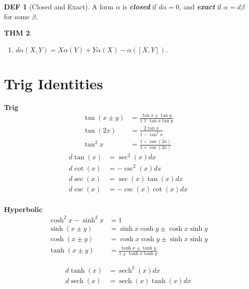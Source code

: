 \documentclass[twocolumn]{article}
\renewcommand{\emph}[1]{\textbf{\textit{#1}}}
\DeclareMathOperator{\sech}{sech}
\newtheorem{thm}{THM}
\theoremstyle{definition}
\newtheorem{defi}[thm]{DEF}
\begin{document}
\begin{defi}[Closed and Exact]
	A form $\alpha$ is \emph{closed} if $d \alpha = 0$, and \emph{exact} if $\alpha = d \beta$ for some $\beta$.
\end{defi}
\begin{thm}
	\begin{enumerate}
		\item $d \alpha(X, Y) = X \alpha (Y) + Y \alpha(X) - \alpha([X, Y])$.
	\end{enumerate}
\end{thm}

\section{Trig Identities}

\textbf{Trig}
\begin{align*}
\tan(x \pm y) &= \frac{\tan x \pm \tan y}{1 \mp \tan x \tan y}\\
\tan(2x) &= \frac{2\tan x}{1 - \tan^2 x} \\
\tan^2 x &= \frac{1 - \cos(2x)}{1 + \cos(2x)}
\end{align*}
\begin{align*}
	d \tan(x) &= \sec^2(x) dx\\
	d \cot(x) &= - \csc^2(x) dx\\
	d \sec(x) &= \sec(x)\tan(x) dx\\
	d \csc(x) &= - \csc(x)\cot(x) dx\\
\end{align*}

\textbf{Hyperbolic}
\begin{align*}
\cosh^2 x - \sinh^2 x &= 1 \\
\sinh(x \pm y) &= \sinh x \cosh y \pm \cosh x \sinh y \\
\cosh(x \pm y) &= \cosh x \cosh y \pm \sinh x \sinh y \\
\tanh(x \pm y) &= \frac{\tanh x \pm \tanh y}{1 \pm \tanh x \tanh y}
\end{align*}

\begin{align*}
	d \tanh(x) &= \sech^2(x) dx\\
	d \sech(x) &= \sech(x)\tanh(x) dx\\
\end{align*}
\end{document}
